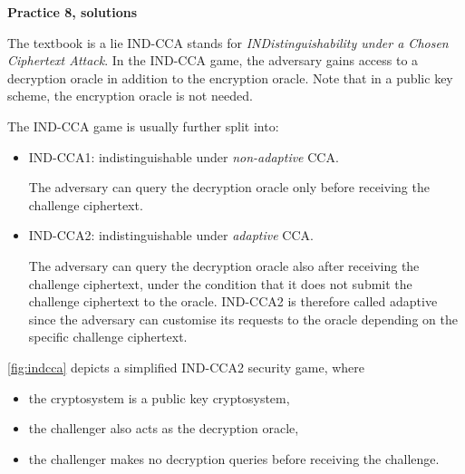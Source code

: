 \documentclass{practice}
\begin{document}
\begin{center}
  \textbf{Practice 8, solutions}
\end{center}

\begin{task}{The textbook is a lie}
  IND-CCA stands for \emph{INDistinguishability under a Chosen Ciphertext Attack}.
  In the IND-CCA game, the adversary gains access to a decryption oracle in addition to the encryption oracle.
  Note that in a public key scheme, the encryption oracle is not needed.

  The IND-CCA game is usually further split into:
  \begin{itemize}
    \item IND-CCA1: indistinguishable under \emph{non-adaptive} CCA.
    
    The adversary can query the decryption oracle only before receiving the challenge ciphertext.

    \item IND-CCA2: indistinguishable under \emph{adaptive} CCA.
    
    The adversary can query the decryption oracle also after receiving the challenge ciphertext, under the condition that it does not submit the challenge ciphertext to the oracle.
    IND-CCA2 is therefore called adaptive since the adversary can customise its requests to the oracle depending on the specific challenge ciphertext.
  \end{itemize}

  \autoref{fig:indcca} depicts a simplified IND-CCA2 security game, where
  \begin{itemize}
    \item the cryptosystem is a public key cryptosystem,
    \item the challenger also acts as the decryption oracle,
    \item the challenger makes no decryption queries before receiving the challenge.
  \end{itemize}

  \begin{figure}[h!]
    \centering
\end{figure}
\end{task}
\end{document}
